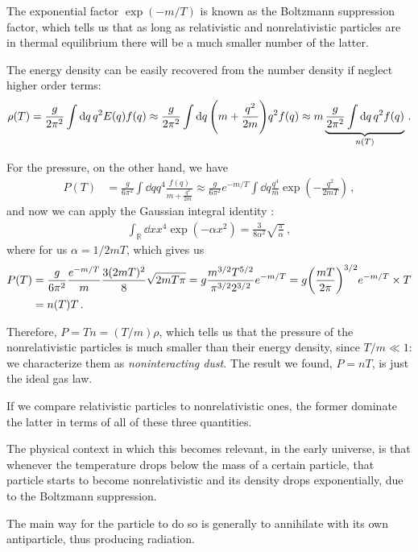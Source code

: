 \documentclass[main.tex]{subfiles}
\begin{document}
The exponential factor \(\exp(- m /T)\) is known as the Boltzmann suppression factor, which tells us that as long as relativistic and nonrelativistic particles are in thermal equilibrium there will be a much smaller number of the latter.

The energy density can be easily recovered from the number density if neglect higher order terms: 
%
\begin{align}
\rho (T) = \frac{g}{2 \pi^2} \int \dd{q} q^2 E(q) f(q) \approx \frac{g}{2 \pi^2 } \int \dd{q} \qty(m + \frac{q^2}{2m}) q^2 f(q) \approx m \underbrace{\frac{g}{2 \pi^2}
\int \dd{q} q^2 f(q)}_{n(T)}
\,.
\end{align}

For the pressure, on the other hand, we have 
%
\begin{align}
P(T) &= \frac{g}{6 \pi^2} \int \dd{q} q^{4} \frac{f(q)}{m + \frac{q^2}{2m}} \approx \frac{g}{6 \pi^2} e^{-m / T} \int \dd{q} \frac{q^{4}}{m} \exp(- \frac{q^2}{2m T}) 
\,,
\end{align}
%
and now we can apply the Gaussian integral identity \cite[special case of eq.\ 10.1.11 (b)]{weberEssentialMathematicalMethods2003}:
%
\begin{align}
\int_{\mathbb{R}} \dd{x} x^{4} \exp(- \alpha x^2) = \frac{3}{8 \alpha^{2}} \sqrt{\frac{\pi }{\alpha}}
\,,
\end{align}
%
where for us \(\alpha = 1/2m T\), which gives us 
%
\begin{align}
P(T) &= \frac{g}{6 \pi^2} \frac{e^{-m/T}}{m}
\frac{3 (2 m T)^2}{8} \sqrt{2 m T \pi }
= g \frac{m^{3/2} T^{5/2} }{\pi^{3/2}2^{3/2}} e^{-m/T} = g \qty(\frac{mT}{2 \pi })^{3/2} e^{-m/T} \times T  \\
&= n(T) T
\,.
\end{align}

Therefore, \(P = T n = (T / m) \rho \), which tells us that the pressure of the nonrelativistic particles is much smaller than their energy density, since \(T /m \ll 1\): we characterize them as \emph{noninteracting dust}.
The result we found, \(P = nT\), is just the ideal gas law.

If we compare relativistic particles to nonrelativistic ones, the former dominate the latter in terms of all of these three quantities.

The physical context in which this becomes relevant, in the early universe, is that whenever the temperature drops below the mass of a certain particle, that particle starts to become nonrelativistic and its density drops exponentially, due to the Boltzmann suppression.

The main way for the particle to do so is generally to annihilate with its own antiparticle, thus producing radiation.
\end{document}
